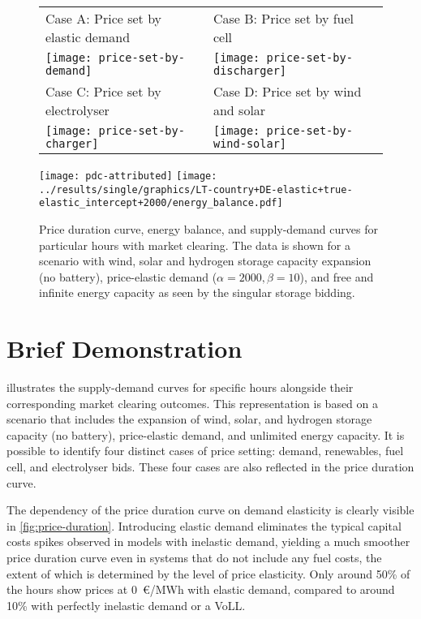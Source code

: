 \documentclass[final,3p]{elsarticle}
\begin{document}
\begin{figure}
	\footnotesize\sffamily
	\begin{tabular}{ll}
		Case A: Price set by elastic demand & Case B: Price set by fuel cell \\
		\texttt{[image: price-set-by-demand]} &
		\texttt{[image: price-set-by-discharger]} \\
		Case C: Price set by electrolyser & Case D: Price set by wind and solar \\
		\texttt{[image: price-set-by-charger]} &
		\texttt{[image: price-set-by-wind-solar]} \\
	\end{tabular}
	\centering
	\texttt{[image: pdc-attributed]}
	\texttt{[image: ../results/single/graphics/LT-country+DE-elastic+true-elastic\_intercept+2000/energy\_balance.pdf]}
	\caption{Price duration curve, energy balance, and supply-demand curves for particular hours with market clearing. The data is shown for a scenario with wind, solar and hydrogen storage capacity expansion (no battery), price-elastic demand ($\alpha=2000, \beta=10$), and free and infinite energy capacity as seen by the singular storage bidding. }
	\label{fig:supply-demand}
\end{figure}


\section*{Brief Demonstration}



 illustrates the supply-demand curves for specific hours
alongside their corresponding market clearing outcomes. This representation is
based on a scenario that includes the expansion of wind, solar, and hydrogen
storage capacity (no battery), price-elastic demand, and unlimited energy
capacity. It is possible to identify four distinct cases of price setting:
demand, renewables, fuel cell, and electrolyser bids. These four cases are also
reflected in the price duration curve.

The dependency of the price duration curve on demand elasticity is clearly
visible in \cref{fig:price-duration}. Introducing elastic demand eliminates the
typical capital costs spikes observed in models with inelastic demand, yielding
a much smoother price duration curve even in systems that do not include any
fuel costs, the extent of which is determined by the level of price elasticity.
Only around 50\% of the hours show prices at 0~\euro/MWh with elastic demand,
compared to around 10\% with perfectly inelastic demand or a VoLL.
\end{document}
